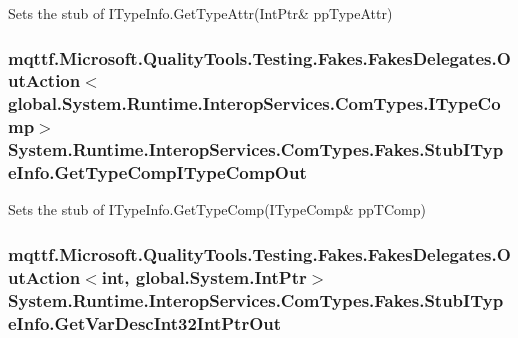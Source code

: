 Sets the stub of I\-Type\-Info.\-Get\-Type\-Attr(Int\-Ptr\& pp\-Type\-Attr)

\hypertarget{class_system_1_1_runtime_1_1_interop_services_1_1_com_types_1_1_fakes_1_1_stub_i_type_info_a072525dfd48798dce11cb48fad2e9f25}{
\subsubsection[{Get\-Type\-Comp\-I\-Type\-Comp\-Out}]{\setlength{\rightskip}{0pt plus 5cm}mqttf.\-Microsoft.\-Quality\-Tools.\-Testing.\-Fakes.\-Fakes\-Delegates.\-Out\-Action$<$global.\-System.\-Runtime.\-Interop\-Services.\-Com\-Types.\-I\-Type\-Comp$>$ System.\-Runtime.\-Interop\-Services.\-Com\-Types.\-Fakes.\-Stub\-I\-Type\-Info.\-Get\-Type\-Comp\-I\-Type\-Comp\-Out}}\label{class_system_1_1_runtime_1_1_interop_services_1_1_com_types_1_1_fakes_1_1_stub_i_type_info_a072525dfd48798dce11cb48fad2e9f25}


Sets the stub of I\-Type\-Info.\-Get\-Type\-Comp(I\-Type\-Comp\& pp\-T\-Comp)

\hypertarget{class_system_1_1_runtime_1_1_interop_services_1_1_com_types_1_1_fakes_1_1_stub_i_type_info_a27c61506b1d408d5dda6513bd60c8c5d}{
\subsubsection[{Get\-Var\-Desc\-Int32\-Int\-Ptr\-Out}]{\setlength{\rightskip}{0pt plus 5cm}mqttf.\-Microsoft.\-Quality\-Tools.\-Testing.\-Fakes.\-Fakes\-Delegates.\-Out\-Action$<$int, global.\-System.\-Int\-Ptr$>$ System.\-Runtime.\-Interop\-Services.\-Com\-Types.\-Fakes.\-Stub\-I\-Type\-Info.\-Get\-Var\-Desc\-Int32\-Int\-Ptr\-Out}}\label{class_system_1_1_runtime_1_1_interop_services_1_1_com_types_1_1_fakes_1_1_stub_i_type_info_a27c61506b1d408d5dda6513bd60c8c5d}


